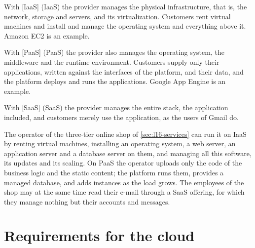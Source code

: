 \documentclass[../main.tex]{subfiles}
\begin{document}
With
[IaaS]
(IaaS) the provider manages the physical infrastructure, that is, the
network, storage and servers, and its virtualization.  Customers rent virtual machines and
install and manage the operating system and everything above it.  Amazon
EC2 is an example.

With
[PaaS]
(PaaS) the provider also manages the operating system, the middleware and
the runtime environment.  Customers supply only their applications, written
against the interfaces of the platform, and their data, and the platform
deploys and runs the applications.  Google App Engine is an example.

With
[SaaS]
(SaaS) the provider manages the entire stack, the application included, and
customers merely use the application, as the users of Gmail do.

\begin{example}
  The operator of the three-tier online shop of \cref{sec:l16-services} can
  run it on IaaS by renting virtual machines, installing an operating
  system, a web server, an application server and a database server on them,
  and managing all this software, its updates and its scaling.  On PaaS the
  operator uploads only the code of the business logic and the static
  content; the platform runs them, provides a managed database, and adds
  instances as the load grows.  The employees of the shop may at the same
  time read their e-mail through a SaaS offering, for which they manage
  nothing but their accounts and messages.
\end{example}

\section{Requirements for the cloud}
\label{sec:l16-requirements}
\end{document}
